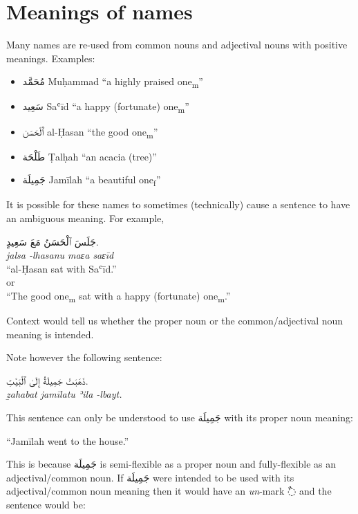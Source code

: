 \documentclass[
  10pt,
]{book}
\providecommand{\tightlist}{%
  \setlength{\itemsep}{0pt}\setlength{\parskip}{0pt}}
\begin{document}
\section{Meanings of names}\label{meanings-of-names}

Many names are re-used from common nouns and adjectival nouns with positive meanings. Examples:

\begin{itemize}
\tightlist
\item
  \foreignlanguage{arabic}{مُحَمَّد} Muḥammad \enquote{a highly praised one\textsubscript{m}}
\item
  \foreignlanguage{arabic}{سَعِيد} Saʿīd \enquote{a happy (fortunate) one\textsubscript{m}}
\item
  \foreignlanguage{arabic}{ٱَلْحَسَن} al-Ḥasan \enquote{the good one\textsubscript{m}}
\item
  \foreignlanguage{arabic}{طَلْحَة} Ṭalḥah \enquote{an acacia (tree)}
\item
  \foreignlanguage{arabic}{جَمِيلَة} Jamīlah \enquote{a beautiful one\textsubscript{f}}
\end{itemize}

It is possible for these names to sometimes (technically) cause a sentence to have an ambiguous meaning. For example,

\foreignlanguage{arabic}{جَلَسَ ٱلْحَسَنُ مَعَ سَعِيدٍ.}\\
\emph{jalsa -lhasanu maɛa saɛīd}\\
\enquote{al-Ḥasan sat with Saʿīd.}\\
or\\
\enquote{The good one\textsubscript{m} sat with a happy (fortunate) one\textsubscript{m}.}

Context would tell us whether the proper noun or the common/adjectival noun meaning is intended.

Note however the following sentence:

\foreignlanguage{arabic}{ذَهَبَتْ جَمِيلَةُ إِلَىٰ ٱلْبَيْتِ.}\\
\emph{ẕahabat jamīlatu ʾila -lbayt.}

This sentence can only be understood to use \foreignlanguage{arabic}{جَمِيلَة} with its proper noun meaning:

\enquote{Jamīlah went to the house.}

This is because \foreignlanguage{arabic}{جَمِيلَة} is semi-flexible as a proper noun and fully-flexible as an adjectival/common noun. If \foreignlanguage{arabic}{جَمِيلَة} were intended to be used with its adjectival/common noun meaning then it would have an \emph{un}-mark \foreignlanguage{arabic}{◌ٌ} and the sentence would be:
\end{document}
